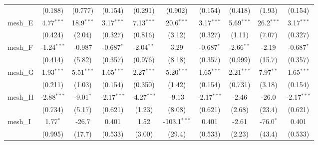 \begin{tabular}{lccccccccc}
                                                               & (0.188)       & (0.777)       & (0.154)       & (0.291)       & (0.902)        & (0.154)       & (0.418)       & (1.93)        & (0.154)\\   
   mesh\_E                                                     & 4.77$^{***}$  & 18.9$^{***}$  & 3.17$^{***}$  & 7.13$^{***}$  & 20.6$^{***}$   & 3.17$^{***}$  & 5.69$^{***}$  & 26.2$^{***}$  & 3.17$^{***}$\\   
                                                               & (0.424)       & (2.04)        & (0.327)       & (0.816)       & (3.12)         & (0.327)       & (1.11)        & (7.07)        & (0.327)\\   
   mesh\_F                                                     & -1.24$^{***}$ & -0.987        & -0.687$^{*}$  & -2.04$^{**}$  & 3.29           & -0.687$^{*}$  & -2.66$^{**}$  & -2.19         & -0.687$^{*}$\\   
                                                               & (0.414)       & (5.82)        & (0.357)       & (0.976)       & (8.18)         & (0.357)       & (0.999)       & (15.7)        & (0.357)\\   
   mesh\_G                                                     & 1.93$^{***}$  & 5.51$^{***}$  & 1.65$^{***}$  & 2.27$^{***}$  & 5.20$^{***}$   & 1.65$^{***}$  & 2.21$^{***}$  & 7.97$^{**}$   & 1.65$^{***}$\\   
                                                               & (0.211)       & (1.03)        & (0.154)       & (0.350)       & (1.42)         & (0.154)       & (0.731)       & (3.18)        & (0.154)\\   
   mesh\_H                                                     & -2.88$^{***}$ & -9.01$^{*}$   & -2.17$^{***}$ & -4.27$^{***}$ & -9.13          & -2.17$^{***}$ & -2.46         & -26.0         & -2.17$^{***}$\\   
                                                               & (0.734)       & (5.17)        & (0.621)       & (1.23)        & (8.08)         & (0.621)       & (2.68)        & (23.4)        & (0.621)\\   
   mesh\_I                                                     & 1.77$^{*}$    & -26.7         & 0.401         & 1.52          & -103.1$^{***}$ & 0.401         & -2.61         & -76.0$^{*}$   & 0.401\\   
                                                               & (0.995)       & (17.7)        & (0.533)       & (3.00)        & (29.4)         & (0.533)       & (2.23)        & (43.4)        & (0.533)\\   

\end{tabular}
